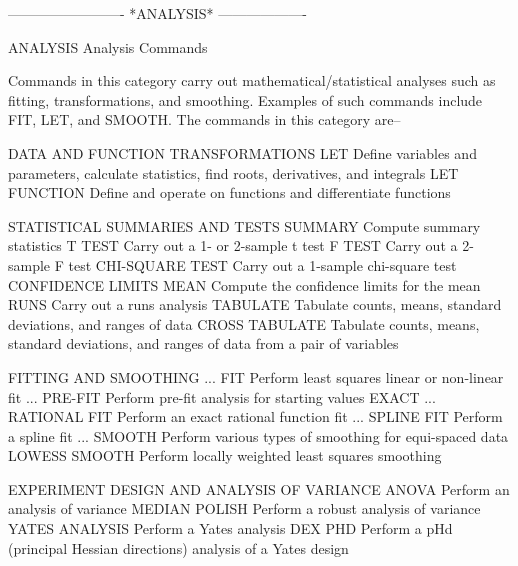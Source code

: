  
 
 
 
 
 
 
 
 
 
 
 
 
 
 
-------------------------  *ANALYSIS*  -------------------
 
ANALYSIS
Analysis Commands
 
Commands in this category carry out mathematical/statistical analyses
such as fitting, transformations, and smoothing.  Examples of such
commands include FIT, LET, and SMOOTH.  The commands in this category
are--
 
DATA AND FUNCTION TRANSFORMATIONS
   LET                     Define variables and parameters, calculate
                           statistics, find roots, derivatives, and
                           integrals
   LET FUNCTION            Define and operate on functions and
                           differentiate functions
 
STATISTICAL SUMMARIES AND TESTS
   SUMMARY                 Compute summary statistics
   T TEST                  Carry out a 1- or 2-sample t test
   F TEST                  Carry out a 2-sample F test
   CHI-SQUARE TEST         Carry out a 1-sample chi-square test
   CONFIDENCE LIMITS MEAN  Compute the confidence limits for the mean
   RUNS                    Carry out a runs analysis
   TABULATE                Tabulate counts, means, standard deviations,
                           and ranges of data
   CROSS TABULATE          Tabulate counts, means, standard deviations,
                           and ranges of data from a pair of variables
 
FITTING AND SMOOTHING
   ... FIT                 Perform least squares linear or non-linear
                           fit
   ... PRE-FIT             Perform pre-fit analysis for starting values
   EXACT ... RATIONAL FIT  Perform an exact rational function fit
   ... SPLINE FIT          Perform a spline fit
   ... SMOOTH              Perform various types of smoothing for
                           equi-spaced data
   LOWESS SMOOTH           Perform locally weighted least squares
                           smoothing
 
EXPERIMENT DESIGN AND ANALYSIS OF VARIANCE
   ANOVA                   Perform an analysis of variance
   MEDIAN POLISH           Perform a robust analysis of variance
   YATES ANALYSIS          Perform a Yates analysis
   DEX PHD                 Perform a pHd (principal Hessian directions)
                           analysis of a Yates design
 
